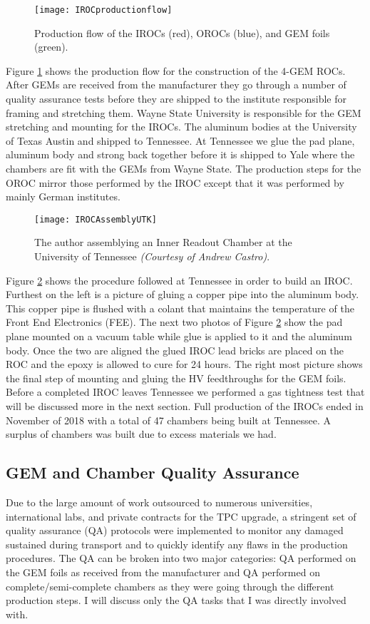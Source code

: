 \begin{figure}[h]
\texttt{[image: IROCproductionflow]}
\centering
\caption{Production flow of the IROCs (red), OROCs (blue), and GEM foils (green)\cite{Dick2017QM}. }
\label{fig:IROCprod}
\end{figure}

\noindent
Figure \ref{fig:IROCprod} shows the production flow for the construction of the 4-GEM ROCs.  After GEMs are received from the manufacturer they go through a number of quality assurance tests before they are shipped to the institute responsible for framing and stretching them.  Wayne State University is responsible for the GEM stretching and mounting for the IROCs.   The aluminum bodies at the University of Texas Austin and shipped to Tennessee.  At Tennessee we glue the pad plane, aluminum body and strong back together before it is shipped to Yale where the chambers are fit with the GEMs from Wayne State.  The production steps for the OROC mirror those performed by the IROC except that it was performed by mainly German institutes.

\begin{figure}[h!]
\texttt{[image: IROCAssemblyUTK]}
\centering
\caption{The author assemblying an Inner Readout Chamber at the University of Tennessee \textit{(Courtesy of Andrew Castro)}. }
\label{fig:IROCassm}
\end{figure}

Figure \ref{fig:IROCassm} shows the procedure followed at Tennessee in order to build an IROC.  Furthest on the left is a picture of gluing a copper pipe into the aluminum body.  This copper pipe is flushed with a colant that maintains the temperature of the Front End Electronics (FEE).  The next two photos of Figure \ref{fig:IROCassm} show the pad plane mounted on a vacuum table while glue is applied to it and the aluminum body.  Once the two are aligned the glued IROC lead bricks are placed on the ROC and the epoxy is allowed to cure for 24 hours.  The right most picture shows the final step of mounting and gluing the HV feedthroughs for the GEM foils.  Before a completed IROC leaves Tennessee we performed a gas tightness test that will be discussed more in the next section.
Full production of the IROCs ended in November of 2018 with a total of 47 chambers being built at Tennessee.  A surplus of chambers was built due to excess materials we had.


\subsection{GEM and Chamber Quality Assurance}
Due to the large amount of work outsourced to numerous universities, international labs, and private contracts for the TPC upgrade, a stringent set of quality assurance (QA)\cite{Brucken:2018rej}\cite{Brucken:2017qjy} protocols were implemented to monitor any damaged sustained during transport and to quickly identify any flaws in the production procedures.  The QA can be broken into two major categories: QA performed on the GEM foils as received from the manufacturer and QA performed on complete/semi-complete chambers as they were going through the different production steps.  I will discuss only the QA tasks that I was directly involved with.

